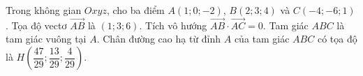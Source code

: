 \begin{ex}
Trong không gian $Oxyz$, cho ba điểm $A(1;0;-2)$, $B(2;3;4)$ và $C(-4;-6;1)$.
\choiceTF
{\True Tọa độ vectơ $\overrightarrow{AB}$ là $(1;3;6)$.}
{Tích vô hướng $\overrightarrow{AB}\cdot\overrightarrow{AC}=0$.}
{Tam giác $ABC$ là tam giác vuông tại $A$.}
{Chân đường cao hạ từ đỉnh $A$ của tam giác $ABC$ có tọa độ là $H\left(\dfrac{47}{29};\dfrac{13}{29};\dfrac4{29}\right)$.}
\end{ex}
